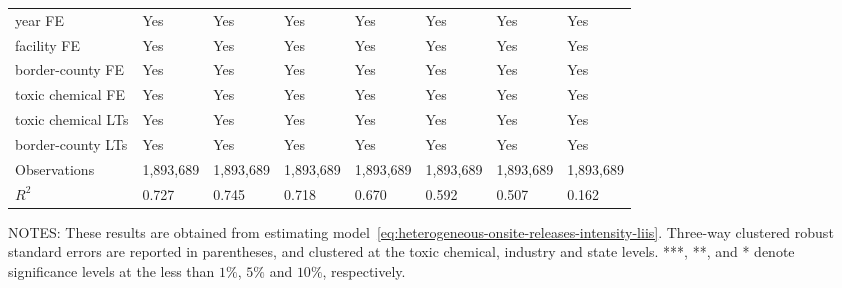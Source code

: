 \begin{table}[H]
{\begin{tabular}{@{}llllllll@{}}
            year FE                               & Yes       & Yes           & Yes       & Yes          & Yes             & Yes           & Yes                 \\
            facility FE                           & Yes       & Yes           & Yes       & Yes          & Yes             & Yes           & Yes                 \\
            border-county FE                      & Yes       & Yes           & Yes       & Yes          & Yes             & Yes           & Yes                 \\
            toxic chemical FE                     & Yes       & Yes           & Yes       & Yes          & Yes             & Yes           & Yes                 \\
            toxic chemical LTs                    & Yes       & Yes           & Yes       & Yes          & Yes             & Yes           & Yes                 \\
            border-county LTs                     & Yes       & Yes           & Yes       & Yes          & Yes             & Yes           & Yes                 \\\midrule
            Observations                          & 1,893,689 & 1,893,689     & 1,893,689 & 1,893,689    & 1,893,689       & 1,893,689     & 1,893,689           \\
            $R^2$                                 & 0.727     & 0.745         & 0.718     & 0.670        & 0.592           & 0.507         & 0.162               \\ \bottomrule \bottomrule
        \end{tabular}%
    }
    \begin{minipage}{\columnwidth}
        \vspace{0.05in}
        \tiny NOTES: These results are obtained from estimating model~\ref{eq:heterogeneous-onsite-releases-intensity-liis}. Three-way clustered robust standard errors are reported in parentheses, and clustered at the toxic chemical, industry and state levels. ***, **, and * denote significance levels at the less than $1\%$, $5\%$ and $10\%$, respectively.
    \end{minipage}
\end{table}